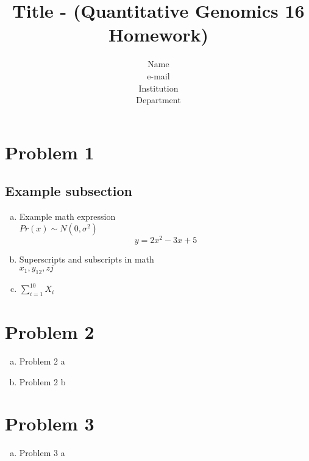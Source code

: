 \documentclass{article}
\begin{document}
\title{Title - (Quantitative Genomics 16 Homework)}  %

\author{Name \\ e-mail \\ Institution \\ Department} %


\maketitle

\section*{Problem 1}
\subsection*{Example subsection}

	\begin{enumerate}[(a)]
	\item Example math expression \\
	$Pr(x) \sim N(0, \sigma^2) $ \\
	$$ y = 2x^2 - 3x + 5$$
	
	\item Superscripts and subscripts in math \\
	$x_1, y_{12}, z{j}$ \\
	
	\item $\sum_{i = 1}^{10} X_i$
	
		
	\end{enumerate}
	
\section*{Problem 2}
	\begin{enumerate}[(a)]
	\item Problem 2 a \\

	\item Problem 2 b\\
	
	\end{enumerate}
	
\section*{Problem 3}
	\begin{enumerate}[(a)]
		\item Problem 3 a 
		
		
	\end{enumerate}
\end{document}
